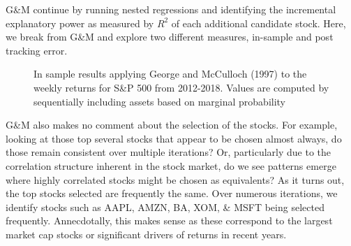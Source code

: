 \documentclass[a4paper, 12pt]{article}
\theoremstyle{plain}
\theoremstyle{definition}
\theoremstyle{remark}
\begin{document}
G\&M continue by running nested regressions and identifying the incremental explanatory power as measured by $R^2$ of each additional candidate stock. Here, we break from G\&M and explore two different measures, in-sample and post tracking error.

\begin{figure}[H]
\hfill
{}
\caption{In sample results applying George and McCulloch (1997) to the weekly returns for S\&P 500 from 2012-2018. Values are computed by sequentially including assets based on marginal probability }
\end{figure}

G\&M also makes no comment about the selection of the stocks. For example, looking at those top several stocks that appear to be chosen almost always, do those remain consistent over multiple iterations? Or, particularly due to the correlation structure inherent in the stock market, do we see patterns emerge where highly correlated stocks might be chosen as equivalents? As it turns out, the top stocks selected are frequently the same. Over numerous iterations, we identify stocks such as AAPL, AMZN, BA, XOM, \& MSFT being selected frequently. Annecdotally, this makes sense as these correspond to the largest market cap stocks or significant drivers of returns in recent years.
\end{document}
